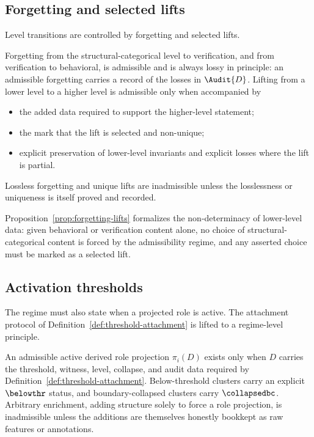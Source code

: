 \subsection{Forgetting and selected lifts}\label{subsec:forgetting-lifts}

Level transitions are controlled by forgetting and selected lifts.

\begin{proposition}\label{prop:forgetting-lifts}
Forgetting from the structural-categorical level to verification, and
from verification to behavioral, is admissible and is always lossy in
principle: an admissible forgetting carries a record of the losses in
\(\Audit{D}\). Lifting from a lower level to a higher level is
admissible only when accompanied by
\begin{itemize}[topsep=2pt,itemsep=1pt]
  \item the added data required to support the higher-level statement;
  \item the mark that the lift is selected and non-unique;
  \item explicit preservation of lower-level invariants and explicit
    losses where the lift is partial.
\end{itemize}
Lossless forgetting and unique lifts are inadmissible unless the losslessness
or uniqueness is itself proved and recorded.
\end{proposition}

\begin{remark}\label{rem:lower-to-higher-non-determinacy}
Proposition~\ref{prop:forgetting-lifts} formalizes the non-determinacy of
lower-level data: given behavioral or verification content alone, no
choice of structural-categorical content is forced by the admissibility
regime, and any asserted choice must be marked as a selected lift.
\end{remark}

\subsection{Activation thresholds}\label{subsec:activation-thresholds}

The regime must also state when a projected role is active. The
attachment protocol of Definition~\ref{def:threshold-attachment} is
lifted to a regime-level principle.

\begin{proposition}\label{prop:activation-thresholds}
An admissible active derived role projection \(\pi_i(D)\) exists only when
\(D\) carries the threshold, witness, level, collapse, and audit data
required by Definition~\ref{def:threshold-attachment}. Below-threshold
clusters carry an explicit \(\belowthr\) status, and boundary-collapsed
clusters carry \(\collapsedbc\). Arbitrary enrichment, adding structure
solely to force a role projection, is inadmissible unless the additions
are themselves honestly bookkept as raw features or annotations.
\end{proposition}

